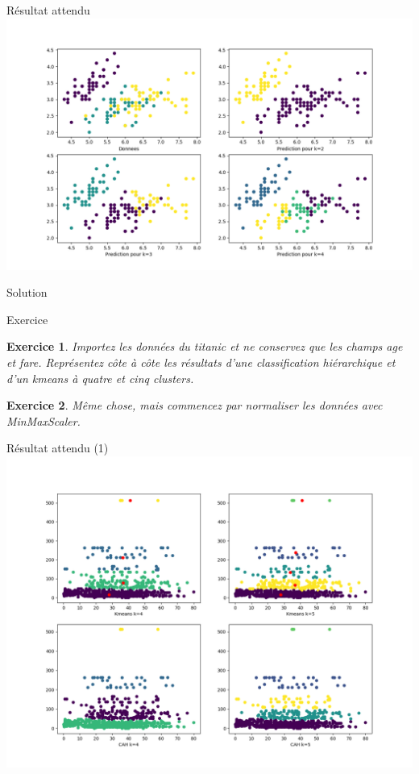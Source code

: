 \documentclass[11pt]{beamer}
\newtheorem{exercice}{Exercice}
\newcommand{\Pythonsmall}[1]{
	{\scriptsize }
}
\begin{document}
\begin{frame}{Résultat attendu}
\includegraphics[scale=0.35]{ex504}
\end{frame}

\begin{frame}{Solution}
\Pythonsmall{ex504}
\end{frame}

\begin{frame}{Exercice}
\begin{exercice}
Importez les données du titanic et ne conservez que les champs \textit{age} et \textit{fare}. Représentez côte à côte les résultats d'une classification hiérarchique et d'un kmeans à quatre et cinq clusters.
\end{exercice}
\begin{exercice}
Même chose, mais commencez par normaliser les données avec MinMaxScaler.
\end{exercice}
\end{frame}

\begin{frame}{Résultat attendu (1)}
\includegraphics[scale=0.3]{ex505}
\end{frame}
\end{document}
